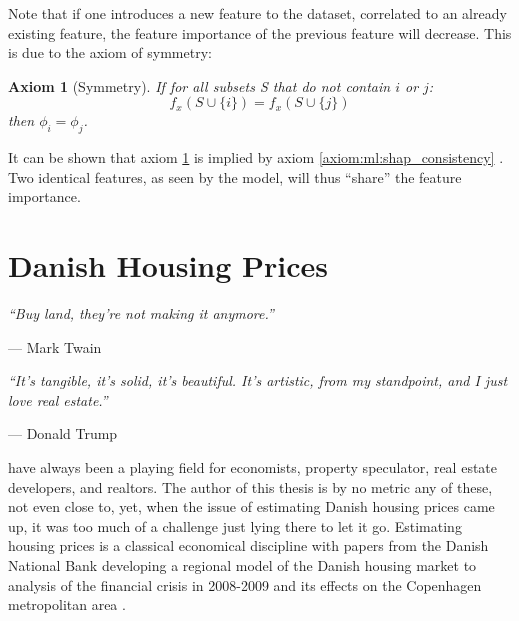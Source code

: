 \documentclass[a4paper, twoside, nobib]{tufte-book}
\newtheorem{axiom}{Axiom}
\newcommand{\q}[1]{``#1''}
\newcommand{\autocite}[1]{\citep{#1}}
\begin{document}
Note that if one introduces a new feature to the dataset, correlated to an already existing feature, the feature importance of the previous feature will decrease. 
This is due to the axiom of symmetry:
\begin{axiom}[Symmetry]
  \label{axiom:ml:shapley_symmetry}
  If for all subsets S that do not contain $i$ or $j$: 
  \begin{equation}
    f_x(S \cup \{i\}) = f_x(S \cup \{j\})
  \end{equation}
  then $\phi_i = \phi_j$.
\end{axiom}
It can be shown that axiom \ref{axiom:ml:shapley_symmetry} is implied by axiom \ref{axiom:ml:shap_consistency}  \citep[Supp. Material]{Lundberg:2017}. Two identical features, as seen by the model, will thus \q{share} the feature importance.

















\chapter{Danish Housing Prices}
\label{ch:housing_price_analysis}
\epigraph{\textit{``Buy land, they’re not making it anymore.''}}{--- Mark Twain}
\epigraph{\textit{``It’s tangible, it’s solid, it’s beautiful. It’s artistic, from my standpoint, and I just love real estate.''}}{--- Donald Trump}
 have always been a playing field for economists, property speculator, real estate developers, and realtors. The author of this thesis is by no metric any of these, not even close to, yet, when the issue of estimating Danish housing prices came up, it was too much of a challenge just lying there to let it go. Estimating housing prices is a classical economical discipline with papers from the Danish National Bank developing a regional model of the Danish housing market \autocite{hviidWorkingPaperRegional2017} to analysis of the financial crisis in 2008-2009 and its effects on the Copenhagen metropolitan area \autocite{mulalicFinancialCrisisDiverging2017}. 
\end{document}
